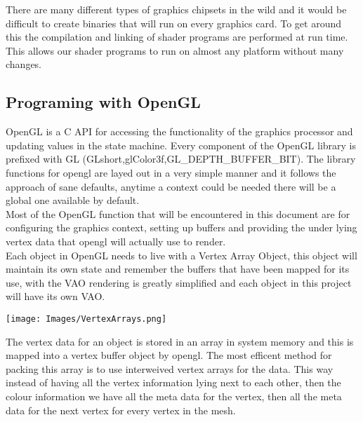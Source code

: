 There are many different types of graphics chipsets in the wild and it would be
difficult to create binaries that will run on every graphics card. To get around
this the compilation and linking of shader programs are performed at run time.
This allows our shader programs to run on almost any platform without many
changes.\\ 

\subsection{Programing with OpenGL}
OpenGL is a C API for accessing the functionality of the graphics processor and
updating values in the state machine. Every component of the OpenGL library is
prefixed with GL (GLshort,glColor3f,GL\_DEPTH\_BUFFER\_BIT). 
The library functions for opengl are layed out in a very simple manner and it
follows the approach of sane defaults, anytime a context could be needed there 
will be a global one available by default.\\

Most of the OpenGL function that will be encountered in this document are for
configuring the graphics context, setting up buffers and providing the under
lying vertex data that opengl will actually use to render.\\

Each object in OpenGL needs to live with a Vertex Array Object, this object will
maintain its own state and remember the buffers that have been mapped for its 
use, with the VAO rendering is greatly simplified and each object in this
project will have its own VAO.\\

\begin{center}
\texttt{[image: Images/VertexArrays.png]}
\end{center}

The vertex data for an object is stored in an array in system memory and this is
mapped into a vertex buffer object by opengl. The most efficent method for 
packing this array is to use interweived vertex arrays for the data. This way
instead of having all the vertex information lying next to each other, then the
colour information we have all the meta data for the vertex, then all the meta
data for the next vertex for every vertex in the mesh.\\

